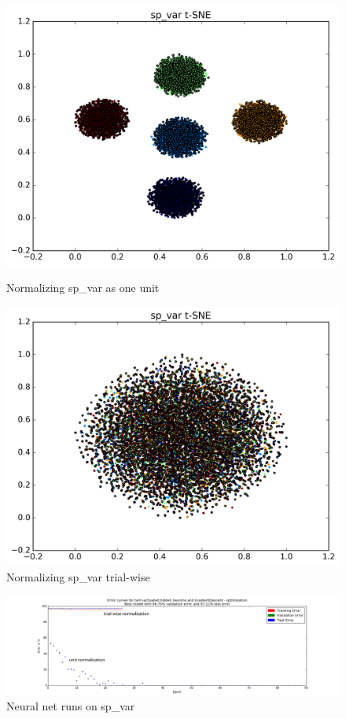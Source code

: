 \documentclass{article} %
\begin{document}
\begin{figure}
	\centering
	\begin{minipage}{0.5\textwidth}
		\centering
		\includegraphics[width=1.0\textwidth]{sp_varu.png}
		\caption{Normalizing sp\_var as one unit}
		\label{fig:sp_var_nT}
	\end{minipage}\hfill
	\begin{minipage}{0.5\textwidth}
		\centering
		\includegraphics[width=1.0\textwidth]{sp_vart.png}
		\caption{Normalizing sp\_var trial-wise}
		\label{fig:sp_var_nF}
	\end{minipage}
\end{figure}
\begin{figure}[h]
	\centering
	\hspace*{-1.7cm}
	\includegraphics[width=1.25\textwidth]{sp_var_double.png}
	\caption{Neural net runs on sp\_var}
	\label{fig:sp_var_double}
\end{figure}
\end{document}
